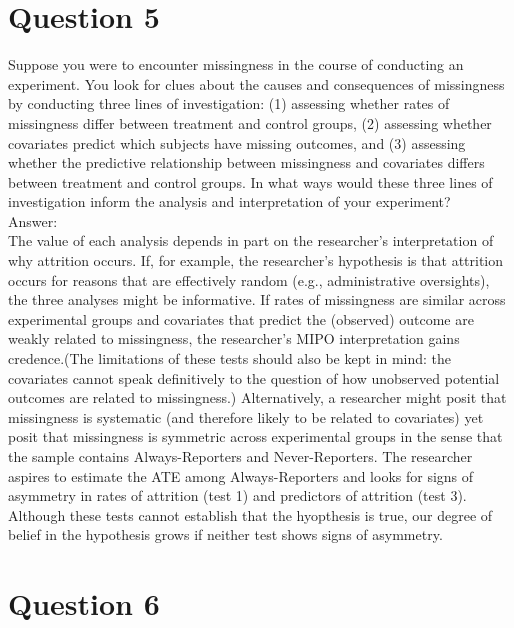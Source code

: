 \documentclass[11pt,notitlepage]{article}\usepackage[]{graphicx}\usepackage[]{color}
\makeatletter
\newenvironment{kframe}{%
 \def\at@end@of@kframe{}%
 \ifinner\ifhmode%
  \def\at@end@of@kframe{\end{minipage}}%
  \begin{minipage}{\columnwidth}%
 \fi\fi%
 \def\FrameCommand##1{\hskip\@totalleftmargin \hskip-\fboxsep
 \colorbox{shadecolor}{##1}\hskip-\fboxsep
     \hskip-\linewidth \hskip-\@totalleftmargin \hskip\columnwidth}%
 \MakeFramed {\advance\hsize-\width
   \@totalleftmargin\z@ \linewidth\hsize
   \@setminipage}}%
 {\par\unskip\endMakeFramed%
 \at@end@of@kframe}
\newenvironment{knitrout}{}{} %
\makeatother
\begin{document}
\section*{Question 5}
Suppose you were to encounter missingness in the course of conducting an experiment. You look for clues about the causes and consequences of missingness by conducting three lines of investigation: (1) assessing whether rates of missingness differ between treatment and control groups, (2) assessing whether covariates predict which subjects have missing outcomes, and (3) assessing whether the predictive relationship between missingness and covariates differs between treatment and control groups. In what ways would these three lines of investigation inform the analysis and interpretation of your experiment?\\
Answer:\\
The value of each analysis depends in part on the researcher's interpretation of why attrition occurs. If, for example, the researcher's hypothesis is that attrition occurs for reasons that are effectively random (e.g., administrative oversights), the three analyses might be informative.  If rates of missingness are similar across experimental groups and covariates that predict the (observed) outcome are weakly related to missingness, the researcher's MIPO interpretation gains credence.(The limitations of these tests should also be kept in mind: the covariates cannot speak definitively to the question of how unobserved potential outcomes are related to missingness.)  Alternatively, a researcher might posit that missingness is systematic (and therefore likely to be related to covariates) yet posit that missingness is symmetric across experimental groups in the sense that the sample contains Always-Reporters and Never-Reporters. The researcher aspires to estimate the ATE among Always-Reporters and looks for signs of asymmetry in rates of attrition (test 1) and predictors of attrition (test 3). Although these tests cannot establish that the hyopthesis is true, our degree of belief in the hypothesis grows if neither test shows signs of asymmetry.
\section*{Question 6}
\begin{knitrout}
\color{fgcolor}\begin{kframe}
\begin{verbatim}





\end{verbatim}
\end{kframe}
\end{knitrout}
\end{document}
